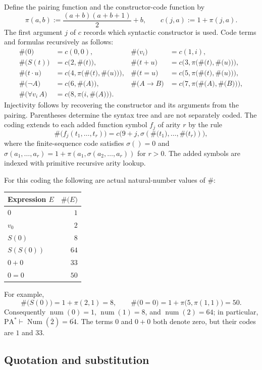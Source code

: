 \documentclass[11pt]{article}
\newcommand{\pair}[2]{\pi\bigl(#1,#2\bigr)}
\newcommand{\ctag}[2]{c\bigl(#1,#2\bigr)}
\newcommand{\PA}{\mathrm{PA}^{*}}
\newcommand{\num}{\operatorname{num}}
\newcommand{\Num}{\operatorname{Num}}
\newcommand{\code}[1]{\#\bigl(#1\bigr)}
\newcommand{\bn}[1]{\overline{#1}}
\newcommand{\defeq}{\mathrel{:=}}
\theoremstyle{definition}
\begin{document}
Define the pairing function and the constructor-code function by
\[
 \pi(a,b)\defeq\frac{(a+b)(a+b+1)}{2}+b,
 \qquad c(j,a)\defeq1+\pi(j,a).
\]
The first argument $j$ of $c$ records which syntactic constructor is used.
Code terms and formulas recursively as follows:
\begin{align*}
 \code0&=c(0,0), & \code{v_i}&=c(1,i),\\
 \code{S(t)}&=\ctag2{\code t},
   &\code{t+u}&=\ctag3{\pair{\code t}{\code u}},\\
 \code{t\cdot u}&=\ctag4{\pair{\code t}{\code u}},
   &\code{t=u}&=\ctag5{\pair{\code t}{\code u}},\\
 \code{\neg A}&=\ctag6{\code A},
   &\code{A\to B}&=\ctag7{\pair{\code A}{\code B}},\\
 \code{\forall v_i\,A}&=\ctag8{\pair i{\code A}}.
\end{align*}
Injectivity follows by recovering the constructor and its arguments from
the pairing. Parentheses determine the syntax tree and are not separately
coded. The coding extends to each added function symbol $f_j$ of arity $r$
by the rule
\[
 \code{f_j(t_1,\ldots,t_r)}
   =c\bigl(9+j,\sigma(\code{t_1},\ldots,\code{t_r})\bigr),
\]
where the finite-sequence code satisfies
$\sigma()=0$ and
$\sigma(a_1,\ldots,a_r)=1+\pi(a_1,\sigma(a_2,\ldots,a_r))$ for $r>0$.
The added symbols are indexed with primitive recursive arity lookup.

For this coding the following are actual natural-number values of $\#$:
\begin{center}
\renewcommand{\arraystretch}{1.12}
\begin{tabular}{@{}lr@{}}
\toprule
Expression $E$ & $\code E$\\
\midrule
$0$ & $1$\\
$v_0$ & $2$\\
$S(0)$ & $8$\\
$S(S(0))$ & $64$\\
$0+0$ & $33$\\
$0=0$ & $50$\\
\bottomrule
\end{tabular}
\end{center}
For example,
\[
 \code{S(0)}=1+\pi(2,1)=8,\qquad
 \code{0=0}=1+\pi\bigl(5,\pi(1,1)\bigr)=50.
\]
Consequently $\num(0)=1$, $\num(1)=8$, and $\num(2)=64$;
in particular, $\PA\vdash\Num(\bn2)=\bn{64}$.
The terms $0$ and $0+0$ both denote zero, but their codes are $1$ and $33$.

\subsection{Quotation and substitution}
\end{document}
